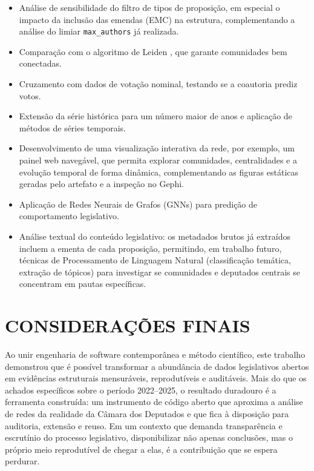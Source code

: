 \documentclass[
      12pt,
      a4paper,
      openright,
      oneside,
      chapter=TITLE,
      section=TITLE,
      english,
      french,
      spanish,
      brazilian
    ]{abntex2}
\begin{document}
    \begin{itemize}
        \item Análise de sensibilidade do filtro de tipos de proposição, em especial o impacto da inclusão das emendas (EMC) na estrutura, complementando a análise do limiar \texttt{max\_authors} já realizada.
        \item Comparação com o algoritmo de Leiden \cite{traag2019}, que garante comunidades bem conectadas.
        \item Cruzamento com dados de votação nominal, testando se a coautoria prediz votos.
        \item Extensão da série histórica para um número maior de anos e aplicação de métodos de séries temporais.
        \item Desenvolvimento de uma visualização interativa da rede, por exemplo, um painel web navegável, que permita explorar comunidades, centralidades e a evolução temporal de forma dinâmica, complementando as figuras estáticas geradas pelo artefato e a inspeção no Gephi.
        \item Aplicação de Redes Neurais de Grafos (GNNs) para predição de comportamento legislativo.
        \item Análise textual do conteúdo legislativo: os metadados brutos já extraídos incluem a ementa de cada proposição, permitindo, em trabalho futuro, técnicas de Processamento de Linguagem Natural (classificação temática, extração de tópicos) para investigar se comunidades e deputados centrais se concentram em pautas específicas.
    \end{itemize}
    
    \section{CONSIDERAÇÕES FINAIS}
    
    Ao unir engenharia de software contemporânea e método científico, este trabalho demonstrou que é possível transformar a abundância de dados legislativos abertos em evidências estruturais mensuráveis, reprodutíveis e auditáveis. Mais do que os achados específicos sobre o período 2022--2025, o resultado duradouro é a ferramenta construída: um instrumento de código aberto que aproxima a análise de redes da realidade da Câmara dos Deputados e que fica à disposição para auditoria, extensão e reuso. Em um contexto que demanda transparência e escrutínio do processo legislativo, disponibilizar não apenas conclusões, mas o próprio meio reprodutível de chegar a elas, é a contribuição que se espera perdurar.
    
\end{document}
